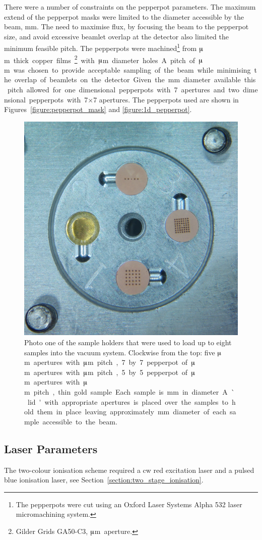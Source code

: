 There were a number of constraints on the pepperpot parameters.
The maximum extend of the pepperpot masks were limited to the diameter accessible by the beam, \unit[2]{mm}.
The need to maximise flux, by focusing the beam to the pepperpot size, and avoid excessive beamlet overlap at the detector also limited the minimum feasible pitch.
The pepperpots were machined\footnote{The pepperpots were cut using an Oxford Laser Systems Alpha 532 laser micromachining system.} from \unit[25]{$\muup$m} thick copper films\footnote{Gilder Grids GA50-C3, \unit[50]{$\muup$m} aperture.} with \unit[50]{$\muup$m} diameter holes.
A pitch of \unit[200]{$\muup$m} was chosen to provide acceptable sampling of the beam while minimising the overlap of beamlets on the detector.
Given the \unit[2]{mm} diameter available this pitch allowed for one dimensional pepperpots with 7 apertures and two dimensional pepperpots with 7$\times$7 apertures.
The pepperpots used are shown in Figures~\ref{figure:pepperpot_mask} and \ref{figure:1d_pepperpot}.

\begin{figure}
    \center
    \includegraphics[width=0.49\linewidth]{part2/Figs/sample_holder.jpg}
    \caption[Sample holder.]{Photo one of the sample holders that were used to load up to eight samples into the vacuum system. Clockwise from the top: five \unit[50]{$\muup$m} apertures with \unit[300]{$\muup$m} pitch, 7 by 7 pepperpot of \unit[50]{$\muup$m} apertures with \unit[200]{$\muup$m} pitch, 5 by 5 pepperpot of \unit[50]{$\muup$m} apertures with \unit[300]{$\muup$m} pitch, thin gold sample. Each sample is \unit[3]{mm} in diameter. A `lid' with appropriate apertures is placed over the samples to hold them in place leaving approximately \unit[2]{mm} diameter of each sample accessible to the beam.}
    \label{figure:sample_holder_pepperpots}
\end{figure}

\subsection{Laser Parameters}
The two-colour ionisation scheme required a \gls{cw} red excitation laser and a pulsed blue ionisation laser, see Section~\ref{section:two_stage_ionisation}.

